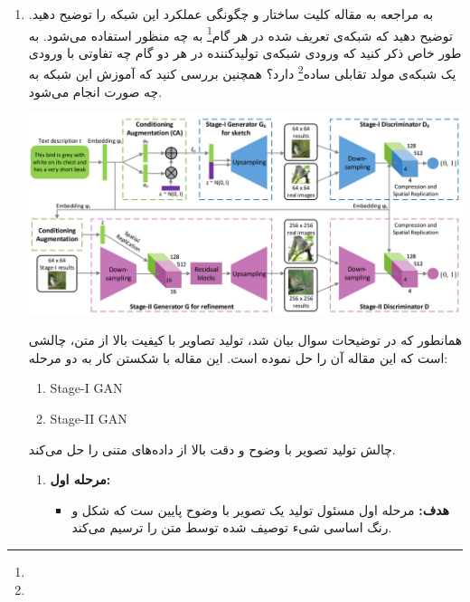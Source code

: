\begin{enumerate}
	\item
	به مراجعه به مقاله \href{https://arxiv.org/abs/1612.03242}{\textcolor{magenta}{}} کلیت ساختار و چگونگی عملکرد این شبکه را توضیح دهید. توضیح دهید که شبکه‌ی تعریف شده در هر گام\footnote{} به چه منظور استفاده می‌شود. به طور خاص ذکر کنید که ورودی شبکه‌ی تولیدکننده در هر دو گام چه تفاوتی با ورودی یک شبکه‌ی مولد تقابلی ساده\footnote{} دارد؟ همچنین بررسی کنید که آموزش این شبکه به چه صورت انجام می‌شود.
	
	\begin{center}
		\includegraphics*[width=0.9\linewidth]{pics/img1.png}
		\label{معماری کلی شبکه مولد تقابلی پشته ای}
	\end{center}
	
	\begin{qsolve}
همانطور که در توضیحات سوال بیان شد، تولید تصاویر با کیفیت بالا از متن، چالشی است که این مقاله آن را حل نموده است. این مقاله با شکستن کار به دو مرحله:
	
	\begin{latin}
		\begin{enumerate}
			\item Stage-I GAN
			\item Stage-II GAN
		\end{enumerate}
	\end{latin}
	
	چالش تولید تصویر با وضوح و دقت بالا از داده‌های متنی را حل می‌کند.
	
	\begin{enumerate}
		\item 
		\textbf{مرحله اول: }\\
		
		\begin{itemize}
			\item \textbf{هدف: }مرحله اول  مسئول تولید یک تصویر  با وضوح پایین ست که شکل و رنگ اساسی شیء توصیف شده توسط متن را ترسیم می‌کند.
			

\end{itemize}
\end{enumerate}
\end{qsolve}
\end{enumerate}
